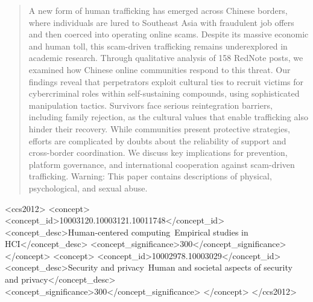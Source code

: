 \documentclass[sigconf,nonacm]{acmart}
\begin{document}
\begin{CJK}{UTF8}{gbsn}
\begin{abstract}
A new form of human trafficking has emerged across Chinese borders, where individuals are lured to Southeast Asia with fraudulent job offers and then coerced into operating online scams. Despite its massive economic and human toll, this scam-driven trafficking remains underexplored in academic research. Through qualitative analysis of 158 RedNote posts, we examined how Chinese online communities respond to this threat. Our findings reveal that perpetrators exploit cultural ties to recruit victims for cybercriminal roles within self-sustaining compounds, using sophisticated manipulation tactics. Survivors face serious reintegration barriers, including family rejection, as the cultural values that enable trafficking also hinder their recovery. While communities present protective strategies, efforts are complicated by doubts about the reliability of support and cross-border coordination. We discuss key implications for prevention, platform governance, and international cooperation against scam-driven trafficking.
Warning: This paper contains descriptions of physical, psychological, and sexual abuse.
\end{abstract}



\begin{CCSXML}
<ccs2012>
   <concept>
       <concept_id>10003120.10003121.10011748</concept_id>
       <concept_desc>Human-centered computing~Empirical studies in HCI</concept_desc>
       <concept_significance>300</concept_significance>
       </concept>
   <concept>
       <concept_id>10002978.10003029</concept_id>
       <concept_desc>Security and privacy~Human and societal aspects of security and privacy</concept_desc>
       <concept_significance>300</concept_significance>
       </concept>
 </ccs2012>
\end{CCSXML}



\end{CJK}
\end{document}
